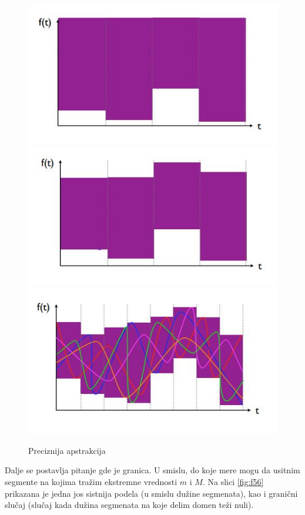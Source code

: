 \documentclass[a4paper]{article}
\begin{document}
\begin{figure}[h!]
\begin{center}
\includegraphics[scale=0.3]{f2.JPG}
\includegraphics[scale=0.3]{f3.JPG}
\includegraphics[scale=0.3]{f4.JPG}
\end{center}
\caption{Preciznija apstrakcija}
\label{fig:f234}
\end{figure} \newline
Dalje se postavlja pitanje gde je granica. U smislu, do koje mere mogu da usitnim segmente na kojima tražim ekstremne vrednosti $m$ i $M$. Na slici \ref{fig:f56} prikazana je jedna jos sistnija podela (u smislu dužine segmenata), kao i granični slučaj (slučaj kada dužina segmenata na koje delim domen teži nuli).
\end{document}
